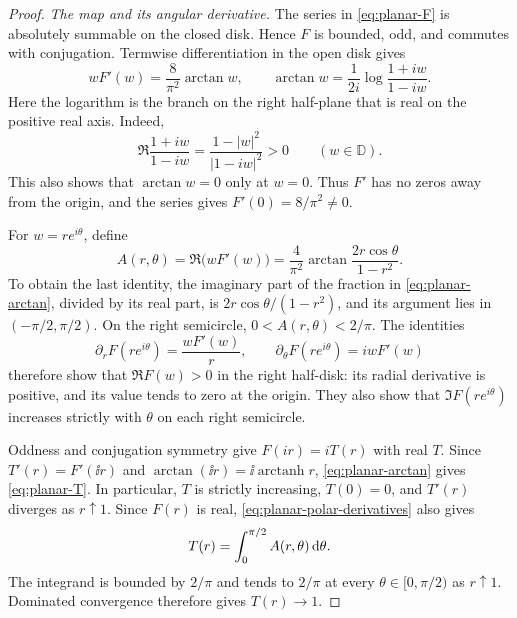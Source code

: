\begin{proof}
\noindent\textit{The map and its angular derivative.} The series in \eqref{eq:planar-F} is absolutely summable on the closed disk.  Hence $F$ is bounded, odd, and commutes with conjugation. Termwise differentiation in the open disk gives
\begin{equation}\label{eq:planar-arctan}
 wF'(w)=\frac{8}{\pi^2}\arctan w,
 \qquad
 \arctan w=\frac{1}{2i}\log\frac{1+iw}{1-iw}.
\end{equation}
Here the logarithm is the branch on the right half-plane that is real on the positive real axis.  Indeed,
\[
 \Re\frac{1+iw}{1-iw}
   =\frac{1-|w|^2}{|1-iw|^2}>0
 \qquad (w\in\mathbb{D}).
\]
This also shows that $\arctan w=0$ only at $w=0$. Thus $F'$ has no zeros away from the origin, and the series gives $F'(0)=8/\pi^2\ne0$.

For $w=re^{i\theta}$, define
\begin{equation}\label{eq:planar-A}
 A(r,\theta)=\Re\bigl(wF'(w)\bigr)
   =\frac{4}{\pi^2}
       \arctan\frac{2r\cos\theta}{1-r^2}.
\end{equation}
To obtain the last identity, the imaginary part of the fraction in \eqref{eq:planar-arctan}, divided by its real part, is $2r\cos\theta/(1-r^2)$, and its argument lies in $(-\pi/2,\pi/2)$.  On the right semicircle, $0<A(r,\theta)<2/\pi$.  The identities
\begin{equation}\label{eq:planar-polar-derivatives}
 \partial_r F(re^{i\theta})=\frac{wF'(w)}{r},
 \qquad
 \partial_\theta F(re^{i\theta})=iwF'(w)
\end{equation}
therefore show that $\Re F(w)>0$ in the right half-disk: its radial derivative is positive, and its value tends to zero at the origin. They also show that $\Im F(re^{i\theta})$ increases strictly with $\theta$ on each right semicircle.

Oddness and conjugation symmetry give $F(ir)=iT(r)$ with real $T$. Since $T'(r)=F'(\ii r)$ and $\arctan(\ii r)=\ii\operatorname{arctanh}r$, \eqref{eq:planar-arctan} gives \eqref{eq:planar-T}.  In particular, $T$ is strictly increasing, $T(0)=0$, and $T'(r)$ diverges as $r\uparrow1$. Since $F(r)$ is real, \eqref{eq:planar-polar-derivatives} also gives
\[
 T(r)=\int_0^{\pi/2}A(r,\theta)\,\mathrm{d} \theta.
\]
The integrand is bounded by $2/\pi$ and tends to $2/\pi$ at every $\theta\in[0,\pi/2)$ as $r\uparrow1$.  Dominated convergence therefore gives $T(r)\to1$.


\end{proof}
